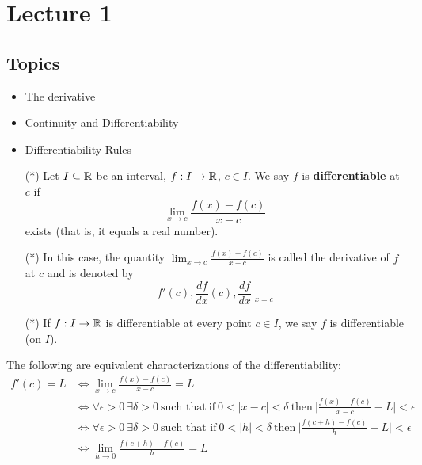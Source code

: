 \documentclass[a4paper]{article}
\begin{document}
\section{Lecture 1}

\subsection{Topics}

\begin{itemize}
    \item The derivative
    \item Continuity and Differentiability
    \item Differentiability Rules
\end{itemize}

\begin{definition}[Differentiability]
    \begin{enumerate}
        \item[(*)] Let \( I \subseteq  \mathbb{R}  \) be an interval, \( f: I \to \mathbb{R}  \), \( c \in I  \). We say \( f  \) is \textbf{differentiable} at \( c  \) if 
    \[  \lim_{ x \to c }  \frac{ f(x) -f(c) }{ x - c  } \]
    exists (that is, it equals a real number).
    \item[(*)] In this case, the quantity \( \lim_{ x \to c }  \frac{ f(x) - f(c) }{ x - c  }  \) is called the derivative of \( f  \) at \( c  \) and is denoted by
        \[  f'(c), \frac{ df }{ dx }(c), \frac{ df }{ dx } \Bigg|_{x = c} \]
    \item[(*)] If \( f: I \to \mathbb{R}  \) is differentiable at every point \( c \in I  \), we say \( f \) is differentiable (on \( I  \)).
    \end{enumerate}
\end{definition}

\begin{remark}
    The following are equivalent characterizations of the differentiability:
    \begin{align*}
        f'(c) = L &\iff \lim_{ x \to c }  \frac{ f(x) - f(c) }{ x - c  }  = L  \\
                  &\iff \forall \epsilon > 0 \ \exists \delta > 0 \ \text{such that} \ \text{if} \ 0 < | x - c  | < \delta \ \text{then} \ \Big| \frac{ f(x) - f(c) }{ x - c  }  - L  \Big|  < \epsilon \\
                  &\iff \forall \epsilon > 0 \ \exists \delta > 0 \ \text{such that if} \ 0 < | h  |  < \delta \ \text{then} \ \Big| \frac{ f(c+h) - f(c) }{  h  }  - L  \Big|  < \epsilon \\
                  &\iff \lim_{ h \to 0 }  \frac{ f(c+h) - f(c) }{  h  }  = L 
    \end{align*}
\end{remark}
\end{document}
